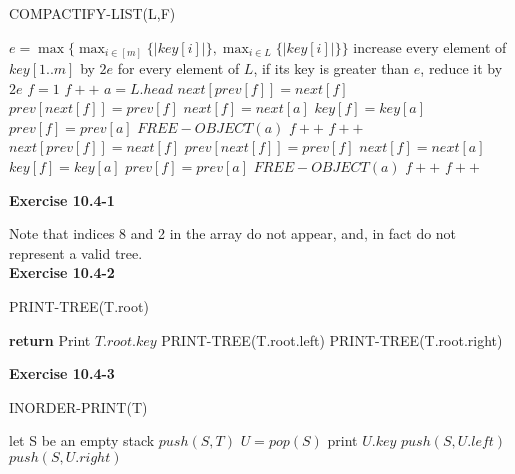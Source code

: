 \documentclass{article}
\begin{document}
\begin{algorithm}
\caption{COMPACTIFY-LIST(L,F)}
\begin{algorithmic}
\State \Return
\EndIf
\State $e = \max\{ \max_{i\in[m]} \{|key[i]|\},\max_{i\in L}\{|key[i]|\}\}$
\State increase every element of $key[1..m]$ by $2e$
\State for every element of $L$, if its key is greater than $e$, reduce it by $2e$
\State $f = 1$
\State $f++$
\EndWhile
\State $a = L.head$
\State $next[prev[f]] = next[f]$
\State $prev[next[f]] = prev[f]$
\State $next[f] = next[a]$
\State $key[f] = key[a]$
\State $prev[f] = prev[a]$
\State $FREE-OBJECT(a)$
\State $f++$
\State $f++$
\EndWhile
\EndIf
{}
\State $next[prev[f]] = next[f]$
\State $prev[next[f]] = prev[f]$
\State $next[f] = next[a]$
\State $key[f] = key[a]$
\State $prev[f] = prev[a]$
\State $FREE-OBJECT(a)$
\State $f++$
\State $f++$
\EndWhile
\EndIf
\EndWhile
\end{algorithmic}
\end{algorithm}

\noindent\textbf{ Exercise 10.4-1} \\


Note that indices 8 and 2 in the array do not appear, and, in fact do not represent a valid tree.\\

\noindent\textbf{Exercise 10.4-2}\\

\begin{algorithm}
\caption{PRINT-TREE(T.root)}
\begin{algorithmic}
	\State \textbf{return}
\Else
	\State Print $T.root.key$
	\State PRINT-TREE(T.root.left)
	\State PRINT-TREE(T.root.right)
\EndIf
\end{algorithmic}
\end{algorithm}

\noindent\textbf{ Exercise 10.4-3} \\
\begin{algorithm}
\caption{INORDER-PRINT(T)}
\begin{algorithmic}
\State let S be an empty stack
\State $push(S,T)$
\State $U = pop(S)$
\State print $U.key$
\State $push(S,U.left)$
\State $push(S,U.right)$
\EndIf
\EndWhile
\end{algorithmic}
\end{algorithm}
\end{document}
